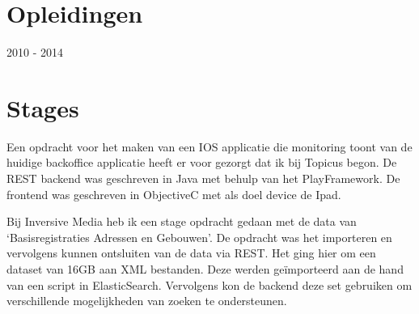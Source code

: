 \documentclass[]{deedy-resume-openfont}
\begin{document}
\begin{minipage}[t]{0.59\textwidth} 

\section{Opleidingen} 

2010 - 2014 
\sectionsep

\sectionsep


\section{Stages}
Een opdracht voor het maken van een IOS applicatie die monitoring toont van de huidige backoffice applicatie heeft er voor gezorgt dat ik bij Topicus begon. 
De REST backend was geschreven in Java met behulp van het PlayFramework. 
De frontend was geschreven in ObjectiveC met als doel device de Ipad.
\sectionsep

Bij Inversive Media heb ik een stage opdracht gedaan met de data van ‘Basisregistraties Adressen en Gebouwen’. 
De opdracht was het importeren en vervolgens kunnen ontsluiten van de data via REST.
Het ging hier om een dataset van 16GB aan XML bestanden. 
Deze werden geïmporteerd aan de hand van een script in ElasticSearch. 
Vervolgens kon de backend deze set gebruiken om verschillende mogelijkheden van zoeken te ondersteunen.
\sectionsep

\end{minipage}
\hfill
\end{document}
